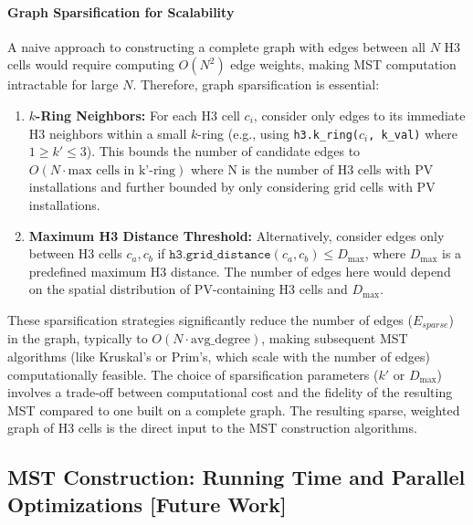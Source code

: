 \begin{multicols}{2}
\paragraph{Graph Sparsification for Scalability}
A naive approach to constructing a complete graph with edges between all $N$ H3 cells would require computing $O(N^2)$ edge weights, making MST computation intractable for large $N$. Therefore, graph sparsification is essential:
\begin{enumerate}
    \item \textbf{$k$-Ring Neighbors:} For each H3 cell $c_i$, consider only edges to its immediate H3 neighbors within a small $k$-ring (e.g., using \texttt{h3.k\_ring(}$c_i$\texttt{, k\_val)} where $1 \geq k' \leq 3$). 
    This bounds the number of candidate edges to $O(N \cdot \text{max cells in k'-ring})$ where N is the number of H3 cells with PV installations and further bounded by only considering grid cells with PV installations.
    \item \textbf{Maximum H3 Distance Threshold:} Alternatively, consider edges only between H3 cells $c_a, c_b$ if $\texttt{h3.grid\_distance}(c_a, c_b) \leq D_{\max}$, where $D_{\max}$ is a predefined maximum H3 distance. 
    The number of edges here would depend on the spatial distribution of PV-containing H3 cells and $D_{\max}$.
\end{enumerate}
These sparsification strategies significantly reduce the number of edges ($E_{sparse}$) in the graph, typically to $O(N \cdot \text{avg\_degree})$, making subsequent MST algorithms (like Kruskal's or Prim's, which scale with the number of edges) computationally feasible. 
The choice of sparsification parameters ($k'$ or $D_{\max}$) involves a trade-off between computational cost and the fidelity of the resulting MST compared to one built on a complete graph.
The resulting sparse, weighted graph of H3 cells is the direct input to the MST construction algorithms. 

\end{multicols}

\subsection{MST Construction: Running Time and Parallel Optimizations [Future Work]}
\label{subsec:mst_construction}

